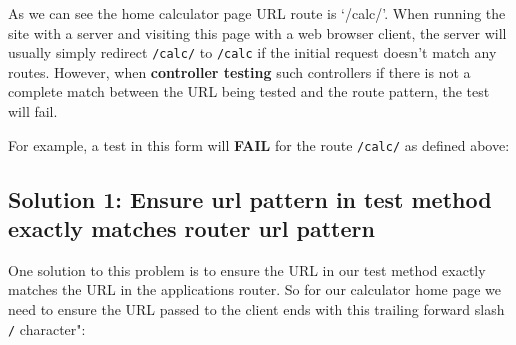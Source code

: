 \documentclass[a4paperpaper,openright]{book}
\newenvironment{Shaded}{}{}
\newcommand{\KeywordTok}[1]{\textcolor[rgb]{0.00,0.44,0.13}{\textbf{#1}}}
\newcommand{\NormalTok}[1]{#1}
\newcommand{\OtherTok}[1]{\textcolor[rgb]{0.00,0.44,0.13}{#1}}
\newcommand{\StringTok}[1]{\textcolor[rgb]{0.25,0.44,0.63}{#1}}
\begin{document}
As we can see the home calculator page URL route is `/calc/'. When
running the site with a server and visiting this page with a web browser
client, the server will usually simply redirect \texttt{/calc/} to
\texttt{/calc} if the initial request doesn't match any routes. However,
when \textbf{controller testing} such controllers if there is not a
complete match between the URL being tested and the route pattern, the
test will fail.

For example, a test in this form will \textbf{FAIL} for the route
\texttt{/calc/} as defined above:

\begin{Shaded}
\end{Shaded}

\hypertarget{solution-1-ensure-url-pattern-in-test-method-exactly-matches-router-url-pattern}{%
\subsection{Solution 1: Ensure url pattern in test method exactly
matches router url
pattern}\label{solution-1-ensure-url-pattern-in-test-method-exactly-matches-router-url-pattern}}

One solution to this problem is to ensure the URL in our test method
exactly matches the URL in the applications router. So for our
calculator home page we need to ensure the URL passed to the client ends
with this trailing forward slash \texttt{/} character":
\end{document}
